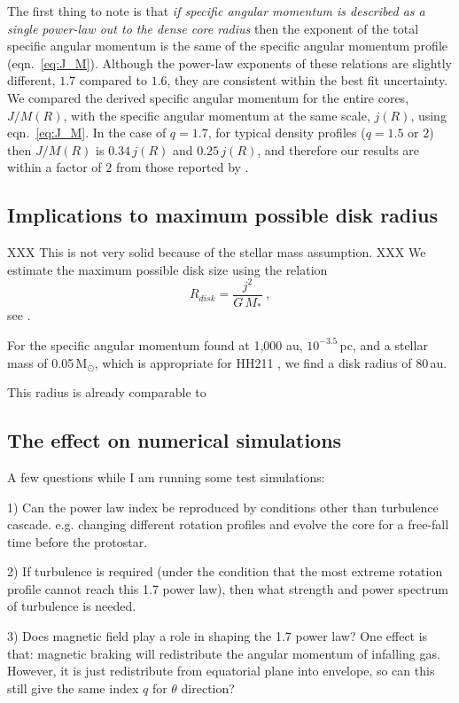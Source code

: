 The first thing to note is that \emph{if specific angular momentum is described as a single power-law out to the dense core radius} 
then the exponent of the total specific angular momentum is the same of the 
specific angular momentum profile (eqn.~\ref{eq:J_M}). 
%
Although the power-law exponents of these relations are slightly different, 
$1.7$ compared to $1.6$, they are 
consistent within the best fit uncertainty. 
We compared the derived specific angular momentum for the entire cores, $J/M(R)$, 
with the specific angular momentum at the same scale, $j(R)$, using eqn.~\ref{eq:J_M}. 
In the case of $q=1.7$, for typical density profiles ($q=1.5$ or $2$) then 
$J/M(R)$ is $0.34\,j(R)$ and $0.25\,j(R)$, and therefore our results are within a factor of $2$
from those reported by \cite{Goodman_1993}. 

\subsection{Implications to maximum possible disk radius}
XXX This is not very solid because of the stellar mass assumption. XXX
We estimate the maximum possible disk size using the relation
\begin{equation}
R_{disk} = \frac{j^2}{G\,M_*}~,
\end{equation}
see \cite{Yen_2015}.

For the specific angular momentum found at 1,000 au, $10^{-3.5}$\,\kms pc, and a stellar mass 
of 0.05\,M$_\odot$, which is appropriate for HH211 \citep{Lee_2009,Froebrich_2003},  
we find a disk radius of 80\,au.

This radius is already comparable to 

\subsection{The effect on numerical simulations}
A few questions while I am running some test simulations:

1) Can the power law index be reproduced by conditions other than turbulence cascade.
  e.g. changing different rotation profiles and evolve the core for a free-fall time before the protostar. 
  
2) If turbulence is required (under the condition that the most extreme rotation profile cannot reach this 1.7 power law), then what strength and power spectrum of turbulence is needed.

3) Does magnetic field play a role in shaping the 1.7 power law?
  One effect is that: magnetic braking will redistribute the angular momentum of infalling gas.
  However, it is just redistribute from equatorial plane into envelope, so can this still give the same index $q$ for $\theta$ direction?

  

  
  